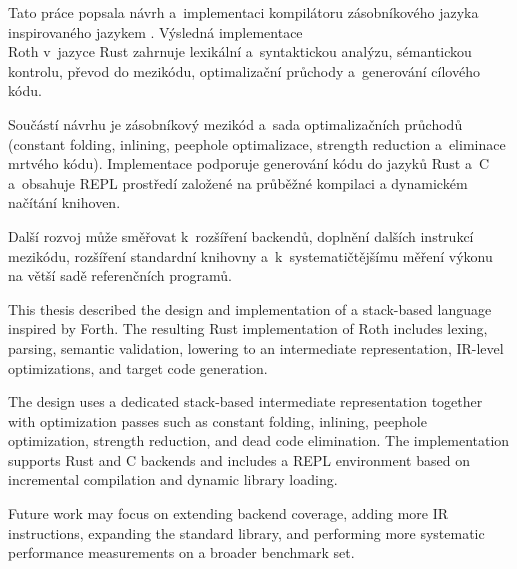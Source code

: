 \begin{kiconclusions}
	Tato práce popsala návrh a~implementaci kompilátoru zásobníkového jazyka
	inspirovaného jazykem \Forth{}. Výsledná implementace \\Roth{} v~jazyce Rust
	zahrnuje lexikální a~syntaktickou analýzu, sémantickou kontrolu, převod do
	mezikódu, optimalizační průchody a~generování cílového kódu.

	Součástí návrhu je zásobníkový mezikód a~sada optimalizačních průchodů
	(constant folding, inlining, peephole optimalizace, strength reduction
	a~eliminace mrtvého kódu). Implementace podporuje generování kódu do jazyků
	Rust a~C a~obsahuje REPL prostředí založené na průběžné kompilaci a dynamickém
	načítání knihoven.

	Další rozvoj může směřovat k~rozšíření backendů, doplnění dalších instrukcí
	mezikódu, rozšíření standardní knihovny a~k~systematičtějšímu měření výkonu
	na větší sadě referenčních programů.
\end{kiconclusions}

\begin{kiconclusions}[english]
	This thesis described the design and implementation of a stack-based language
	inspired by Forth. The resulting Rust implementation of Roth includes lexing,
	parsing, semantic validation, lowering to an intermediate representation,
	IR-level optimizations, and target code generation.

	The design uses a dedicated stack-based intermediate representation together
	with optimization passes such as constant folding, inlining, peephole
	optimization, strength reduction, and dead code elimination. The implementation
	supports Rust and C backends and includes a REPL environment based on
	incremental compilation and dynamic library loading.

	Future work may focus on extending backend coverage, adding more IR
	instructions, expanding the standard library, and performing more systematic
	performance measurements on a broader benchmark set.
\end{kiconclusions}
